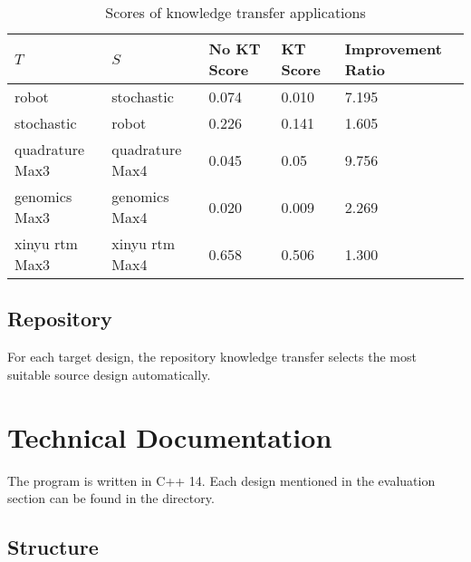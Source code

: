 \documentclass[10pt,a4paper]{article}
\begin{document}
\begin{table}[H]
	\begin{tabularx}{\linewidth}{X X X X X}
		\hline
		$T$ & $S$ & No KT Score & KT Score & Improvement Ratio\\
		\hline
		robot & stochastic & 0.074 & 0.010 & 7.195\\
		stochastic & robot & 0.226 & 0.141 & 1.605\\
		quadrature Max3 & quadrature Max4 & 0.045 & 0.05 & 9.756\\
		genomics Max3 & genomics Max4 & 0.020 & 0.009 & 2.269\\
		xinyu rtm Max3 & xinyu rtm Max4 & 0.658 & 0.506 & 1.300\\
		\hline
	\end{tabularx}
	\caption{Scores of knowledge transfer applications}
\end{table}

\subsection{Repository}

For each target design, the repository knowledge transfer selects the most suitable source design automatically.
\section{Technical Documentation}

The program is written in C++ 14. Each design mentioned in the evaluation section can be found in the  directory.

\subsection{Structure}
\end{document}
